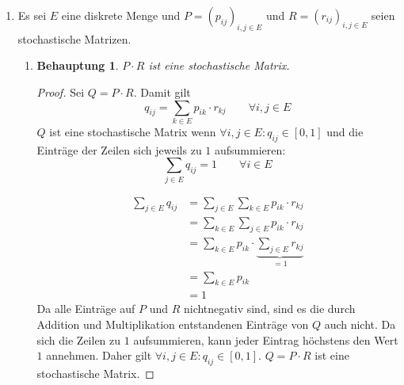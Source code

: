 \documentclass[a4paper]{scrartcl}
\newtheorem*{behaupt}{Behauptung}
\def \blattnr {2}
\begin{document}
\begin{enumerate}[label=\bfseries \blattnr.\arabic*]
    \item
        Es sei $E$ eine diskrete Menge und $P = (p_{ij})_{i,j \in E}$ und $R =
        (r_{ij})_{i,j \in E}$ seien stochastische Matrizen.
        \begin{enumerate}[label=\alph*)]
            \item
                \begin{behaupt}
                    $P \cdot R$ ist eine stochastische Matrix.
                \end{behaupt}
                \begin{proof}
                    Sei $Q = P \cdot R$. Damit gilt
                    \begin{equation*}
                        q_{ij} = \sum_{k \in E} p_{ik} \cdot r_{kj}
                        \qquad
                        \forall i,j \in E
                    \end{equation*}
                    $Q$ ist eine stochastische Matrix wenn $\forall i,j \in E :
                    q_{ij} \in [0,1]$ und die Einträge der Zeilen sich jeweils
                    zu $1$ aufsummieren:
                    \begin{equation*}
                        \sum_{j \in E} q_{ij} = 1
                        \qquad
                        \forall i \in E
                    \end{equation*}

                    \begin{equation*}
                        \begin{split}
                            \sum_{j \in E} q_{ij}
                            &= \sum_{j \in E} \sum_{k \in E}
                                p_{ik} \cdot r_{kj} \\
                            &= \sum_{k \in E} \sum_{j \in E}
                                p_{ik} \cdot r_{kj} \\
                            &= \sum_{k \in E} p_{ik} \cdot
                                \underbrace{\sum_{j \in E} r_{kj}}_{= 1} \\
                            &= \sum_{k \in E} p_{ik} \\
                            &= 1
                        \end{split}
                    \end{equation*}
                    Da alle Einträge auf $P$ und $R$ nichtnegativ sind, sind
                    es die durch Addition und Multiplikation entstandenen
                    Einträge von $Q$ auch nicht.
                    Da sich die Zeilen zu $1$ aufsummieren, kann jeder Eintrag
                    höchstens den Wert $1$ annehmen.
                    Daher gilt $\forall i,j \in E : q_{ij} \in [0,1]$.
                    $Q = P \cdot R$ ist eine stochastische Matrix.
                \end{proof}


\end{enumerate}
\end{enumerate}
\end{document}
